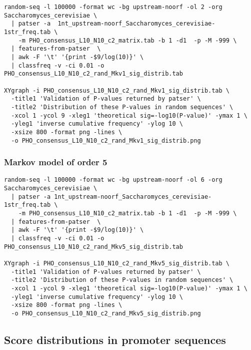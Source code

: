 {\color{Blue} \begin{footnotesize} 
\begin{verbatim}
random-seq -l 100000 -format wc -bg upstream-noorf -ol 2 -org Saccharomyces_cerevisiae \
  | patser -a  1nt_upstream-noorf_Saccharomyces_cerevisiae-1str_freq.tab \
    -m PHO_consensus_L10_N10_c2_matrix.tab -b 1 -d1  -p -M -999 \
  | features-from-patser  \
  | awk -F '\t' '{print -$9/log(10)}' \
  | classfreq -v -ci 0.01 -o PHO_consensus_L10_N10_c2_rand_Mkv1_sig_distrib.tab

XYgraph -i PHO_consensus_L10_N10_c2_rand_Mkv1_sig_distrib.tab \
  -title1 'Validation of P-values returned by patser' \
  -title2 'Distribution of these P-values in random sequences' \
  -xcol 1 -ycol 9 -xleg1 'theoretical sig=-log10(P-value)' -ymax 1 \
  -yleg1 'inverse cumulative frequency' -ylog 10 \
  -xsize 800 -format png -lines \
  -o PHO_consensus_L10_N10_c2_rand_Mkv1_sig_distrib.png 

\end{verbatim} \end{footnotesize}
}

\subsubsection{Markov model of order 5}

{\color{Blue} \begin{footnotesize} 
\begin{verbatim}
random-seq -l 100000 -format wc -bg upstream-noorf -ol 6 -org Saccharomyces_cerevisiae \
  | patser -a 1nt_upstream-noorf_Saccharomyces_cerevisiae-1str_freq.tab \
    -m PHO_consensus_L10_N10_c2_matrix.tab -b 1 -d1  -p -M -999 \
  | features-from-patser  \
  | awk -F '\t' '{print -$9/log(10)}' \
  | classfreq -v -ci 0.01 -o PHO_consensus_L10_N10_c2_rand_Mkv5_sig_distrib.tab

XYgraph -i PHO_consensus_L10_N10_c2_rand_Mkv5_sig_distrib.tab \
  -title1 'Validation of P-values returned by patser' \
  -title2 'Distribution of these P-values in random sequences' \
  -xcol 1 -ycol 9 -xleg1 'theoretical sig=-log10(P-value)' -ymax 1 \
  -yleg1 'inverse cumulative frequency' -ylog 10 \
  -xsize 800 -format png -lines \
  -o PHO_consensus_L10_N10_c2_rand_Mkv5_sig_distrib.png 

\end{verbatim} \end{footnotesize}
}



\subsection{Score distributions in promoter sequences}


